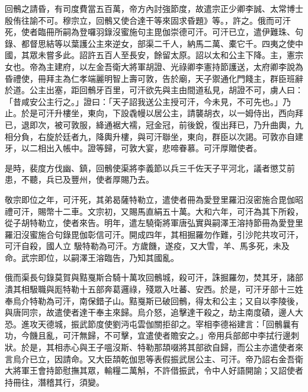 
\begin{pinyinscope}

 回鶻之請昏，有司度費當五百萬，帝方內討強節度，故遣宗正少卿李誠、太常博士殷侑往諭不可。穆宗立，回鶻又使合達干等來固求昏題》等。，許之。俄而可汗死，使者臨冊所嗣為登囉羽錄沒蜜施句主毘伽崇德可汗。可汗已立，遣伊難珠、句錄、都督思結等以葉護公主來逆女，部渠二千人，納馬二萬、橐它千。四夷之使中國，其眾未嘗多此。詔許五百人至長安，餘留太原。詔以太和公主下降。主，憲宗女也。帝為主建府，以左金吾衛大將軍胡證、光祿卿李憲持節護送，太府卿李說為昏禮使，冊拜主為仁孝端麗明智上壽可敦，告於廟，天子禦通化門餞主，群臣班辭於道。公主出塞，距回鶻牙百里，可汗欲先與主由間道私見，胡證不可，虜人曰：「昔咸安公主行之。」證曰：「天子詔我送公主授可汗，今未見，不可先也。」乃止。於是可汗升樓坐，東向，下設毳幔以居公主，請襲胡衣，以一姆侍出，西向拜已，退即次，被可敦服，絳通裾大襦，冠金冠，前後銳，復出拜已，乃升曲輿，九相分負，右旋於廷者九，降輿升樓，與可汗聯坐，東向，群臣以次謁。可敦亦自建牙，以二相出入帳中。證等歸，可敦大宴，悲啼眷慕。可汗厚贈使者。



 是時，裴度方伐幽、鎮，回鶻使渠將李義節以兵三千佐天子平河北，議者懲艾前患，不聽，兵已及豐州，使者厚賜乃去。


敬宗即位之年，可汗死，其弟曷薩特勒立，遣使者冊為愛登里羅汨沒密施合毘伽昭禮可汗，賜幣十二車。文宗初，又賜馬直絹五十萬。大和六年，可汗為其下所殺，從子胡特勒立，使者來告。明年，遣左驍衛將軍唐弘實與嗣澤王溶持節冊為愛登里羅汨沒蜜施合句錄毘伽彰信可汗。開成四年，其相掘羅勿作難，引沙陀共攻可汗，可汗自殺，國人立
 馺特勒為可汗。方歲饑，遂疫，又大雪，羊、馬多死，未及命。武宗即位，以嗣澤王溶臨告，乃知其國亂。



 俄而渠長句錄莫賀與黠戛斯合騎十萬攻回鶻城，殺可汗，誅掘羅勿，焚其牙，諸部潰其相馺職與厖特勒十五部奔葛邏祿，殘眾入吐蕃、安西。於是，可汗牙部十三姓奉烏介特勒為可汗，南保錯子山。黠戛斯已破回鶻，得太和公主；又自以李陵後，與唐同宗，故遣使者達干奉主來歸。烏介怒，追擊達干殺之，劫主南度磧，邊人大恐。進攻天德城，振武節度使劉沔屯雲伽關拒卻之。宰相李德裕建言：「回鶻曩有功，今饑且亂，可汗無歸，不可擊，宜遣使者贍安之。」帝用兵部郎中李拭行邊刺狀。於是，其相赤心與王子嗢沒斯、特勒那頡啜將其部欲自歸，而公主亦遣使者來言烏介已立，因請命。又大臣頡乾伽思等表假振武居公主、可汗。帝乃詔右金吾衛大將軍王會持節慰撫其眾，輸糧二萬斛，不許借振武，令中人好語開諭；又詔使者持冊往，潛稽其行，須變。




\end{pinyinscope}

